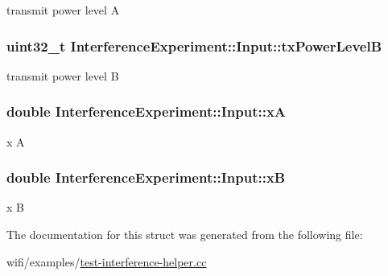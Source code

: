 transmit power level A 

\subsubsection[{\texorpdfstring{tx\+Power\+LevelB}{txPowerLevelB}}]{\setlength{\rightskip}{0pt plus 5cm}uint32\+\_\+t Interference\+Experiment\+::\+Input\+::tx\+Power\+LevelB}\hypertarget{structInterferenceExperiment_1_1Input_a4acd70506b27a4c59504e68639101fd1}{}\label{structInterferenceExperiment_1_1Input_a4acd70506b27a4c59504e68639101fd1}


transmit power level B 

\subsubsection[{\texorpdfstring{xA}{xA}}]{\setlength{\rightskip}{0pt plus 5cm}double Interference\+Experiment\+::\+Input\+::xA}\hypertarget{structInterferenceExperiment_1_1Input_a6af2867adbbc4728d94b1a2591b8e12d}{}\label{structInterferenceExperiment_1_1Input_a6af2867adbbc4728d94b1a2591b8e12d}


x A 

\subsubsection[{\texorpdfstring{xB}{xB}}]{\setlength{\rightskip}{0pt plus 5cm}double Interference\+Experiment\+::\+Input\+::xB}\hypertarget{structInterferenceExperiment_1_1Input_a87cb6a23e8a0cd61578537cc093acba5}{}\label{structInterferenceExperiment_1_1Input_a87cb6a23e8a0cd61578537cc093acba5}


x B 



The documentation for this struct was generated from the following file\+:\begin{DoxyCompactItemize}
\item 
wifi/examples/\hyperlink{test-interference-helper_8cc}{test-\/interference-\/helper.\+cc}\end{DoxyCompactItemize}
